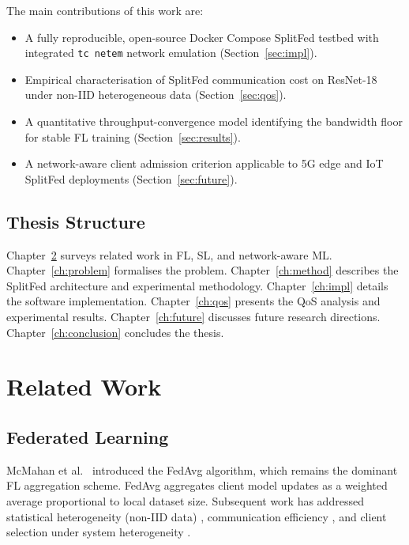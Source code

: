\documentclass[12pt,a4paper]{report}
\begin{document}
The main contributions of this work are:
\begin{itemize}
  \item A fully reproducible, open-source Docker Compose SplitFed testbed with integrated \texttt{tc netem} network emulation (Section~\ref{sec:impl}).
  \item Empirical characterisation of SplitFed communication cost on ResNet-18 under non-IID heterogeneous data (Section~\ref{sec:qos}).
  \item A quantitative throughput-convergence model identifying the bandwidth floor for stable FL training (Section~\ref{sec:results}).
  \item A network-aware client admission criterion applicable to 5G edge and IoT SplitFed deployments (Section~\ref{sec:future}).
\end{itemize}

\section{Thesis Structure}

Chapter~\ref{ch:related} surveys related work in FL, SL, and network-aware ML. Chapter~\ref{ch:problem} formalises the problem. Chapter~\ref{ch:method} describes the SplitFed architecture and experimental methodology. Chapter~\ref{ch:impl} details the software implementation. Chapter~\ref{ch:qos} presents the QoS analysis and experimental results. Chapter~\ref{ch:future} discusses future research directions. Chapter~\ref{ch:conclusion} concludes the thesis.

\chapter{Related Work}
\label{ch:related}

\section{Federated Learning}

McMahan et al.\ \cite{mcmahan2017communication} introduced the FedAvg algorithm, which remains the dominant FL aggregation scheme. FedAvg aggregates client model updates as a weighted average proportional to local dataset size. Subsequent work has addressed statistical heterogeneity (non-IID data) \cite{li2020federated}, communication efficiency \cite{konevcny2016federated}, and client selection under system heterogeneity \cite{lai2021oort}.
\end{document}
